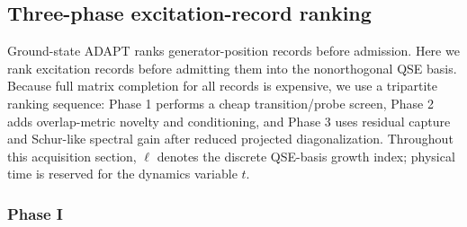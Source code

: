 \documentclass[
  reprint,
  amsmath,
  amssymb,
  aps,
  pra,
  nofootinbib,
  superscriptaddress,
  floatfix
]{revtex4-2}
\begin{document}
\subsection{Three-phase excitation-record ranking}

Ground-state ADAPT ranks generator-position records before admission.  Here we rank excitation records before admitting them into the nonorthogonal QSE basis.  Because full matrix completion for all records is expensive, we use a tripartite ranking sequence: Phase 1 performs a cheap transition/probe screen, Phase 2 adds overlap-metric novelty and conditioning, and Phase 3 uses residual capture and Schur-like spectral gain after reduced projected diagonalization.  Throughout this acquisition section, $\ell$ denotes the discrete QSE-basis growth index; physical time is reserved for the dynamics variable $t$.

\subsubsection{Phase I}
\end{document}
